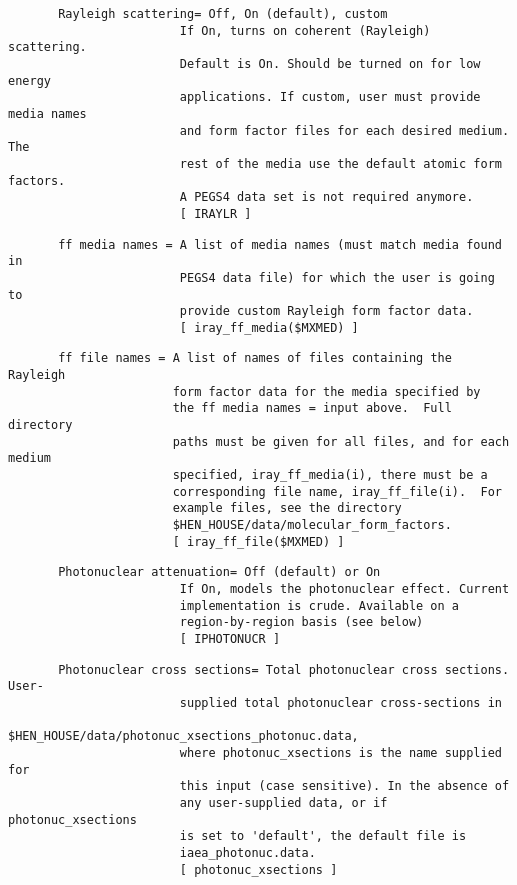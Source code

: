 \begin{verbatim}
       Rayleigh scattering= Off, On (default), custom
                        If On, turns on coherent (Rayleigh) scattering.
                        Default is On. Should be turned on for low energy
                        applications. If custom, user must provide media names
                        and form factor files for each desired medium. The
                        rest of the media use the default atomic form factors.
                        A PEGS4 data set is not required anymore.
                        [ IRAYLR ]
\end{verbatim}
\begin{verbatim}
       ff media names = A list of media names (must match media found in
                        PEGS4 data file) for which the user is going to
                        provide custom Rayleigh form factor data.
                        [ iray_ff_media($MXMED) ]
\end{verbatim}
\begin{verbatim}
       ff file names = A list of names of files containing the Rayleigh
                       form factor data for the media specified by
                       the ff media names = input above.  Full directory
                       paths must be given for all files, and for each medium
                       specified, iray_ff_media(i), there must be a
                       corresponding file name, iray_ff_file(i).  For
                       example files, see the directory
                       $HEN_HOUSE/data/molecular_form_factors.
                       [ iray_ff_file($MXMED) ]
\end{verbatim}
\begin{verbatim}
       Photonuclear attenuation= Off (default) or On
                        If On, models the photonuclear effect. Current
                        implementation is crude. Available on a
                        region-by-region basis (see below)
                        [ IPHOTONUCR ]
\end{verbatim}
\begin{verbatim}
       Photonuclear cross sections= Total photonuclear cross sections. User-
                        supplied total photonuclear cross-sections in
                        $HEN_HOUSE/data/photonuc_xsections_photonuc.data,
                        where photonuc_xsections is the name supplied for
                        this input (case sensitive). In the absence of
                        any user-supplied data, or if photonuc_xsections
                        is set to 'default', the default file is
                        iaea_photonuc.data.
                        [ photonuc_xsections ]
\end{verbatim}
